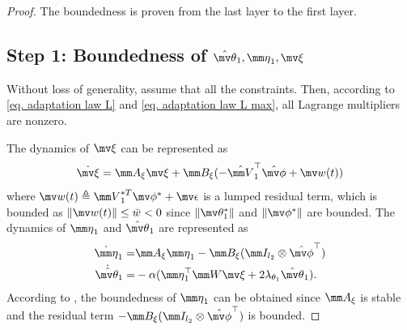 \documentclass[letterpaper, 10 pt, conference]{ieeeconf}  %
\begin{document}
\begin{proof}
The boundedness is proven from the last layer to the first layer.

\subsection*{Step 1: Boundedness of ${\hat{\mv\theta}}_1,{\mm \eta}_1,\mv \xi$}

\color{black}
Without loss of generality, assume that all the constraints. Then, according to \eqref{eq. adaptation law L} and \eqref{eq. adaptation law L max}, all Lagrange multipliers are nonzero.
\color{black}

The dynamics of $\mv \xi$ can be represented as
\begin{equation}    
    \dot {\mv\xi} = \mm A_\xi\mv \xi +\mm B_\xi
    (
        -\hat {\mm V}_1^\top \hat{\mv\phi}+\mv w(t)
    )
\end{equation}
where $\mv w(t)\triangleq {\mm V}_1^{*T}\mv\phi^*+\mv \epsilon$ is a lumped residual term, which is bounded as $\Vert\mv  w(t)\Vert\le \bar w< 0$ since $\Vert\mv\theta_1^*\Vert$ and $\Vert\mv\phi^*\Vert$ are bounded.
The dynamics of ${\mm \eta}_1$ and ${\hat{\mv\theta}}_1$ are represented as
\begin{equation}
    \begin{aligned}
        \dot{\mm \eta}_1 =
        & 
        \mm A_\xi {\mm \eta}_1 -\mm B_\xi (\mm I_{l_{2}}\otimes \hat{\mv\phi}^\top )
        \\
        \dot{{\hat{\mv\theta}}}_1 =
        & -\alpha 
        (
            {\mm \eta}_1^\top \mm W\mv\xi+2\lambda_{\theta_1} {\hat{\mv\theta}}_1
        ).
    \end{aligned} 
\end{equation}
According to \cite[Chap.~4 T.~1.9]{Desoer:2009aa}, the boundedness of ${\mm \eta}_1$ can be obtained since $\mm A_\xi$ is stable and the residual term $-\mm B_\xi (\mm I_{l_{2}}\otimes \hat{\mv\phi}^\top )$ is bounded.


\end{proof}
\end{document}
